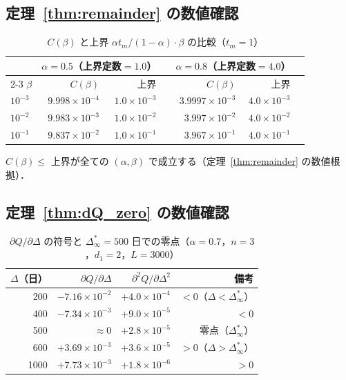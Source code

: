 \documentclass[12pt,a4paper]{article}
\theoremstyle{plain}
\theoremstyle{definition}
\theoremstyle{remark}
\newcommand{\Dinf}{\Delta^{*}_{\infty}}
\begin{document}
\subsection{定理~\ref{thm:remainder} の数値確認}

\begin{table}[h]
\centering
\caption{$C(\beta)$ と上界 $\alpha t_m/(1-\alpha)\cdot\beta$ の比較（$t_m=1$）}
\label{tab:remainder}
\begin{tabular}{@{}lrrlrrl@{}}
\toprule
& \multicolumn{2}{c}{$\alpha=0.5$（上界定数$=1.0$）} &&
\multicolumn{2}{c}{$\alpha=0.8$（上界定数$=4.0$）}\\
\cmidrule{2-3}\cmidrule{5-6}
$\beta$ & $C(\beta)$ & 上界 && $C(\beta)$ & 上界\\
\midrule
$10^{-3}$ & $9.998\times10^{-4}$ & $1.0\times10^{-3}$ &&
$3.9997\times10^{-3}$ & $4.0\times10^{-3}$\\
$10^{-2}$ & $9.983\times10^{-3}$ & $1.0\times10^{-2}$ &&
$3.997\times10^{-2}$ & $4.0\times10^{-2}$\\
$10^{-1}$ & $9.837\times10^{-2}$ & $1.0\times10^{-1}$ &&
$3.967\times10^{-1}$ & $4.0\times10^{-1}$\\
\bottomrule
\end{tabular}
\end{table}

$C(\beta)\le$ 上界が全ての $(\alpha,\beta)$ で成立する（定理~\ref{thm:remainder} の数値根拠）．

\subsection{定理~\ref{thm:dQ_zero} の数値確認}

\begin{table}[h]
\centering
\caption{$\partial Q/\partial\Delta$ の符号と $\Dinf=500$ 日での零点（$\alpha=0.7$，$n=3$，$d_1=2$，$L=3000$）}
\label{tab:dQ}
\begin{tabular}{@{}rrrr@{}}
\toprule
$\Delta$（日）& $\partial Q/\partial\Delta$ & $\partial^2Q/\partial\Delta^2$ & 備考 \\
\midrule
200 & $-7.16\times10^{-2}$ & $+4.0\times10^{-4}$ & $<0$（$\Delta<\Dinf$）\\
400 & $-7.34\times10^{-3}$ & $+9.0\times10^{-5}$ & $<0$ \\
500 & $\approx0$ & $+2.8\times10^{-5}$ & 零点（$\Dinf$）\\
600 & $+3.69\times10^{-3}$ & $+3.6\times10^{-5}$ & $>0$（$\Delta>\Dinf$）\\
1000 & $+7.73\times10^{-3}$ & $+1.8\times10^{-6}$ & $>0$ \\
\bottomrule
\end{tabular}
\end{table}
\end{document}
